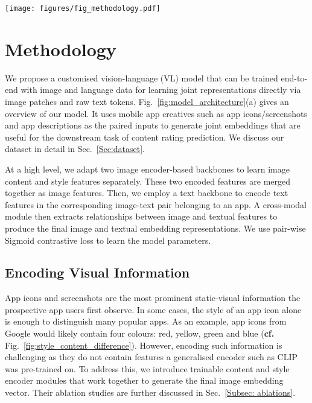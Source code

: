 

\begin{figure*}[ht]
    \centering
    \texttt{[image: figures/fig\_methodology.pdf]}
    \caption{(a): Vision-language model architecture during the training stage. (b): Custom transformer block with cross-attention. (c) Pipeline for the downstream task of content rating classification.}
    \label{fig:model_architecture}
\end{figure*}

\section{Methodology}
\label{Sec:methodology}

We propose a customised vision-language (VL) model that can be trained end-to-end with image and language data for learning joint representations directly via image patches and raw text tokens. Fig.~\ref{fig:model_architecture}(a) gives an overview of our model. It uses mobile app creatives such as app icons/screenshots and app descriptions as the paired inputs to generate joint embeddings that are useful for the downstream task of content rating prediction. We discuss our dataset in detail in Sec.~\ref{Sec:dataset}.


At a high level, we adapt two image encoder-based backbones to learn image content and style features separately. These two encoded features are merged together as image features. Then, we employ a text backbone to encode text features in the corresponding image-text pair belonging to an app. A cross-modal module then extracts relationships between image and textual features to produce the final image and textual embedding representations. We use pair-wise Sigmoid contrastive loss to learn the model parameters.

\subsection{Encoding Visual Information}
\label{sec:visual_info}
App icons and screenshots are the most prominent static-visual information the prospective app users first observe. In some cases, the style of an app icon alone is enough to distinguish many popular apps. As an example, app icons from Google would likely contain four colours: red, yellow, green and blue (\textbf{cf.} Fig.~\ref{fig:style_content_difference}). However, encoding such information 
is challenging as they do not contain features a generalised encoder such as CLIP was pre-trained on. To address this, we introduce trainable content and style encoder modules that work together to generate the final image embedding vector. Their ablation studies are further discussed in Sec.~\ref{Subsec: ablations}. 


